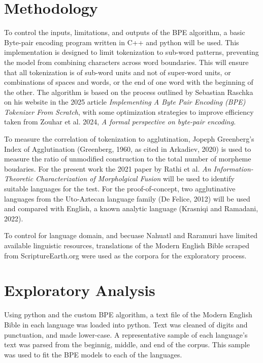 \documentclass[11pt]{article}
\begin{document}
\section{Methodology}
To control the inputs, limitations, and outputs of the BPE algorithm, a basic Byte-pair encoding program written in C++ and python will be used. This implementation is designed to limit tokenization to sub-word patterns, preventing the model from combining characters across word boundaries. This will ensure that all tokenization is of sub-word units and not of super-word units, or combinations of spaces and words, or the end of one word with the beginning of the other. The algorithm is based on the process outlined by Sebastian Raschka on his website in the 2025 article \textit{Implementing A Byte Pair Encoding (BPE) Tokenizer From Scratch}, with some optimization strategies to improve efficiency taken from Zouhar et al. 2024, \textit{A formal perspective on byte-pair encoding}.

To measure the correlation of tokenization to agglutination, Jopeph Greenberg's Index of Agglutination (Greenberg, 1960, as cited in Arkadiev, 2020) is used to measure the ratio of unmodified construction to the total number of morpheme boudaries. For the present work the 2021 paper by Rathi et al. \textit{An Information-Theoretic Characterization of Morpholgical Fusion} will be used to identify suitable languages for the test. For the proof-of-concept, two agglutinative languages from the Uto-Aztecan language family (De Felice, 2012) will be used and compared with English, a known analytic language (Krasniqi and Ramadani, 2022). 

To control for language domain, and becuase Nahuatl and Raramuri have limited available linguistic resources, translations of the Modern English Bible scraped from ScriptureEarth.org were used as the corpora for the exploratory process. 


\section{Exploratory Analysis} 

Using python and the custom BPE algorithm, a text file of the Modern English Bible in each language was loaded into python. Text was cleaned of digits and punctuation, and made lower-case. A representative sample of each language's text was parsed from the beginnig, middle, and end of the corpus. This sample was used to fit the BPE models to each of the languages. 
\end{document}
